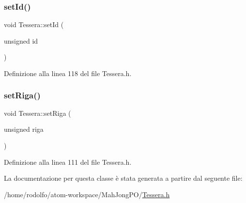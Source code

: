 \subsubsection{\texorpdfstring{set\+Id()}{setId()}}
{\footnotesize\ttfamily void Tessera\+::set\+Id (\begin{DoxyParamCaption}\item[{unsigned}]{id }\end{DoxyParamCaption})\hspace{0.3cm}{\ttfamily [inline]}}



Definizione alla linea 118 del file Tessera.\+h.

\mbox{\label{class_tessera_a7712f69cd258050b8872bd749f5cf47f}} 
\subsubsection{\texorpdfstring{set\+Riga()}{setRiga()}}
{\footnotesize\ttfamily void Tessera\+::set\+Riga (\begin{DoxyParamCaption}\item[{unsigned}]{riga }\end{DoxyParamCaption})\hspace{0.3cm}{\ttfamily [inline]}}



Definizione alla linea 111 del file Tessera.\+h.



La documentazione per questa classe è stata generata a partire dal seguente file\+:\begin{DoxyCompactItemize}
\item 
/home/rodolfo/atom-\/workspace/\+Mah\+Jong\+P\+O/\hyperlink{_tessera_8h}{Tessera.\+h}\end{DoxyCompactItemize}
